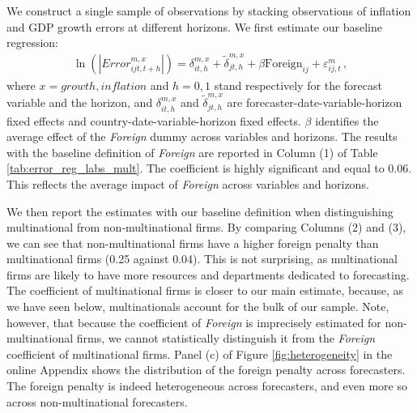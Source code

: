 We construct a single sample of observations by stacking observations of inflation and GDP growth errors at different horizons. We first estimate our baseline regression:
\begin{align}
	\ln(|Error_{ijt,t+h}^{m,x}|)= \delta_{it,h}^{m,x} +\tilde\delta_{jt,h}^{m,x} +  \beta \text{Foreign}_{ij} +\varepsilon_{ij,t}^m  \,, \label{eq:main}
\end{align}
where $x=growth, inflation$ and $h=0,1$ stand respectively for the forecast variable and the horizon, and $ \delta_{it,h}^{m,x}$ and $\tilde\delta_{jt,h}^{m,x}$ are forecaster-date-variable-horizon fixed effects and country-date-variable-horizon fixed effects. $\beta$ identifies the average effect of the \textit{Foreign} dummy across variables and horizons. The results with the baseline definition of \textit{Foreign} are reported in Column (1) of Table \ref{tab:error_reg_labs_mult}. The coefficient is highly significant and equal to 0.06. This reflects the average impact of \textit{Foreign} across variables and horizons.

We then report the estimates with our baseline definition when distinguishing multinational from non-multinational firms. By comparing Columns (2) and (3), we can see that non-multinational firms have a higher foreign penalty than multinational firms (0.25 against 0.04). This is not surprising, as multinational firms are likely to have more resources and departments dedicated to forecasting. The coefficient of multinational firms is closer to our main estimate, because, as we have seen below, multinationals account for the bulk of our sample. Note, however, that because the coefficient of \textit{Foreign} is imprecisely estimated for non-multinational firms, we cannot statistically distinguish it from the \textit{Foreign} coefficient of multinational firms. Panel (c) of Figure \ref{fig:heterogeneity} in the online Appendix shows the distribution of the foreign penalty across forecasters. The foreign penalty is indeed heterogeneous across forecasters, and even more so across non-multinational forecasters.

